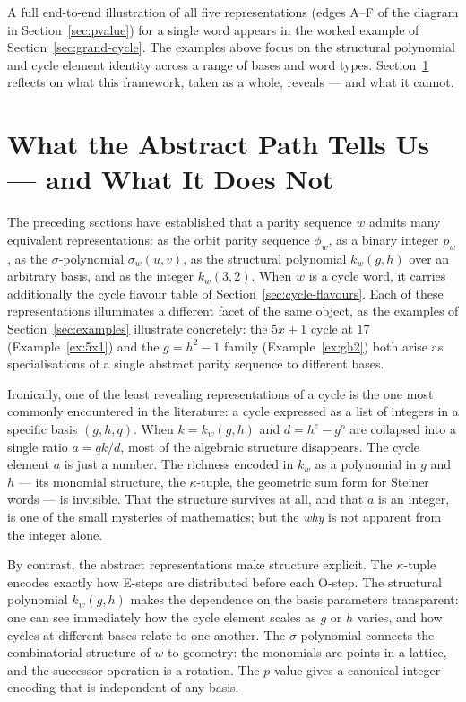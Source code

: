 \documentclass[12pt]{article}
\theoremstyle{definition}
\theoremstyle{remark}
\newcommand{\kpoly}{k}
\begin{document}
A full end-to-end illustration of all five representations (edges A–F of the
diagram in Section~\ref{sec:pvalue}) for a single word appears in the worked
example of Section~\ref{sec:grand-cycle}.  The examples above focus on the
structural polynomial and cycle element identity across a range of bases and
word types.  Section~\ref{sec:abstract-cycle} reflects on what this framework,
taken as a whole, reveals — and what it cannot.

\section{What the Abstract Path Tells Us — and What It Does Not}
\label{sec:abstract-cycle}

The preceding sections have established that a parity sequence $w$ admits
many equivalent representations: as the orbit parity sequence $\phi_w$,
as a binary integer $p_w$, as the $\sigma$-polynomial $\sigma_w(u,v)$,
as the structural polynomial $\kpoly_w(g,h)$ over an arbitrary basis,
and as the integer $\kpoly_w(3,2)$.  When $w$ is a cycle word, it
carries additionally the cycle flavour table of Section~\ref{sec:cycle-flavours}.
Each of these representations illuminates a different facet of the same
object, as the examples of Section~\ref{sec:examples} illustrate concretely:
the $5x+1$ cycle at $17$ (Example~\ref{ex:5x1}) and the $g = h^2 - 1$ family
(Example~\ref{ex:gh2}) both arise as specialisations of a single abstract
parity sequence to different bases.

Ironically, one of the least revealing representations of a cycle is the
one most commonly encountered in the literature: a cycle expressed as a
list of integers in a specific basis $(g,h,q)$.  When $k = \kpoly_w(g,h)$
and $d = h^e - g^o$ are collapsed into a single ratio $a = qk/d$, most
of the algebraic structure disappears.  The cycle element $a$ is just a
number.  The richness encoded in $\kpoly_w$ as a polynomial in $g$ and
$h$ — its monomial structure, the $\kappa$-tuple, the geometric sum form
for Steiner words — is invisible.  That the structure survives at all,
and that $a$ is an integer, is one of the small mysteries of mathematics;
but the \emph{why} is not apparent from the integer alone.

By contrast, the abstract representations make structure explicit.
The $\kappa$-tuple encodes exactly how E-steps are distributed before each
O-step.  The structural polynomial $\kpoly_w(g,h)$ makes the dependence
on the basis parameters transparent: one can see immediately how the cycle
element scales as $g$ or $h$ varies, and how cycles at different bases
relate to one another.  The $\sigma$-polynomial connects the combinatorial
structure of $w$ to geometry: the monomials are points in a lattice, and
the successor operation is a rotation.  The $p$-value gives a canonical
integer encoding that is independent of any basis.
\end{document}
